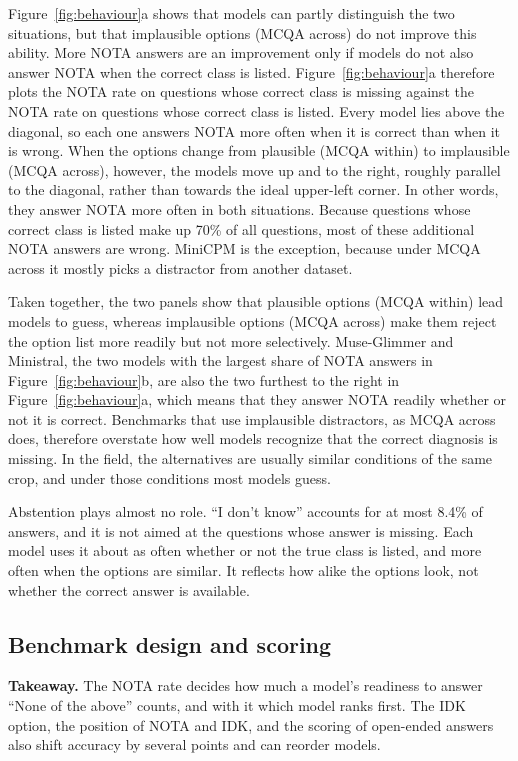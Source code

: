 \documentclass[10pt,letterpaper]{article}
\makeatletter
\newcommand{\takeaway}[1]{\par\smallskip\noindent\colorbox{black!6}{\parbox{\dimexpr\linewidth-2\fboxsep\relax}{\textbf{Takeaway.} #1}}\par\medskip\@afterindentfalse\@afterheading}
\makeatother
\begin{document}
Figure~\ref{fig:behaviour}a shows that models can partly distinguish the two situations, but that implausible options (MCQA across) do not improve this ability. More NOTA answers are an improvement only if models do not also answer NOTA when the correct class is listed. Figure~\ref{fig:behaviour}a therefore plots the NOTA rate on questions whose correct class is missing against the NOTA rate on questions whose correct class is listed. Every model lies above the diagonal, so each one answers NOTA more often when it is correct than when it is wrong. When the options change from plausible (MCQA within) to implausible (MCQA across), however, the models move up and to the right, roughly parallel to the diagonal, rather than towards the ideal upper-left corner. In other words, they answer NOTA more often in both situations. Because questions whose correct class is listed make up 70\% of all questions, most of these additional NOTA answers are wrong. MiniCPM is the exception, because under MCQA across it mostly picks a distractor from another dataset.

Taken together, the two panels show that plausible options (MCQA within) lead models to guess, whereas implausible options (MCQA across) make them reject the option list more readily but not more selectively. Muse-Glimmer and Ministral, the two models with the largest share of NOTA answers in Figure~\ref{fig:behaviour}b, are also the two furthest to the right in Figure~\ref{fig:behaviour}a, which means that they answer NOTA readily whether or not it is correct. Benchmarks that use implausible distractors, as MCQA across does, therefore overstate how well models recognize that the correct diagnosis is missing. In the field, the alternatives are usually similar conditions of the same crop, and under those conditions most models guess.

Abstention plays almost no role. ``I don't know'' accounts for at most 8.4\% of answers, and it is not aimed at the questions whose answer is missing. Each model uses it about as often whether or not the true class is listed, and more often when the options are similar. It reflects how alike the options look, not whether the correct answer is available.

\subsection{Benchmark design and scoring}
\label{sec:results_design}

\takeaway{The NOTA rate decides how much a model's readiness to answer ``None of the above'' counts, and with it which model ranks first. The IDK option, the position of NOTA and IDK, and the scoring of open-ended answers also shift accuracy by several points and can reorder models.}
\end{document}
